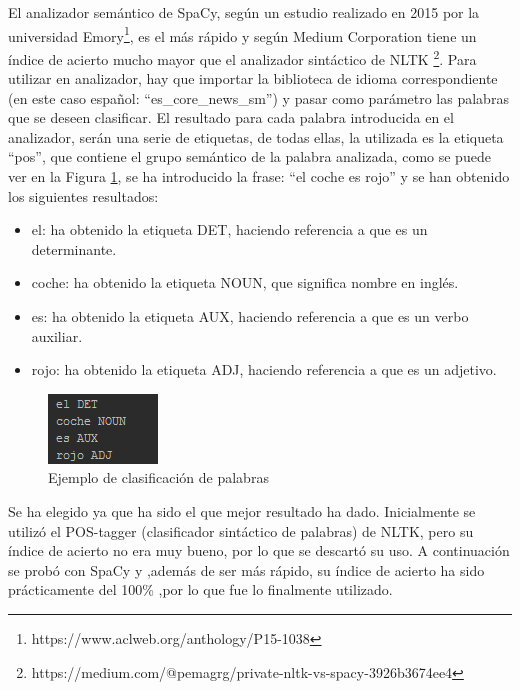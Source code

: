 El analizador semántico de SpaCy, según un estudio realizado en 2015 por la universidad Emory\footnote{https://www.aclweb.org/anthology/P15-1038}, es el más rápido y según Medium Corporation tiene un índice de acierto mucho mayor que el analizador sintáctico de NLTK \footnote{https://medium.com/@pemagrg/private-nltk-vs-spacy-3926b3674ee4}. Para utilizar en analizador, hay que importar la biblioteca de idioma correspondiente (en este caso español: ``es\_core\_news\_sm'') y pasar como parámetro las palabras que se deseen clasificar. El resultado para cada palabra introducida en el analizador, serán una serie de etiquetas, de todas ellas, la utilizada es la etiqueta ``pos'', que contiene el grupo semántico de la palabra analizada, como se puede ver en la Figura \ref{fig:spacy}, se ha introducido la frase: ``el coche es rojo'' y se han obtenido los siguientes resultados:
\begin{itemize}
	\item el: ha obtenido la etiqueta DET, haciendo referencia a que es un determinante.
	\item coche: ha obtenido la etiqueta NOUN, que significa nombre en inglés.
	\item es: ha obtenido la etiqueta AUX, haciendo referencia a que es un verbo auxiliar.
	\item rojo: ha obtenido la etiqueta ADJ, haciendo referencia a que es un adjetivo.
\end{itemize}

\begin{figure}[!h]
	\includegraphics[width=.4\textwidth]{Imagenes/Bitmap/Capitulo3/spacy}
	\centering
	\caption{Ejemplo de clasificación de palabras}
	\label{fig:spacy}
\end{figure}

Se ha elegido ya que ha sido el que mejor resultado ha dado. Inicialmente se utilizó el POS-tagger (clasificador sintáctico de palabras) de NLTK, pero su índice de acierto no era muy bueno, por lo que se descartó su uso. A continuación se probó con SpaCy y ,además de ser más rápido, su índice de acierto ha sido prácticamente del 100\% ,por lo que fue lo finalmente utilizado.

